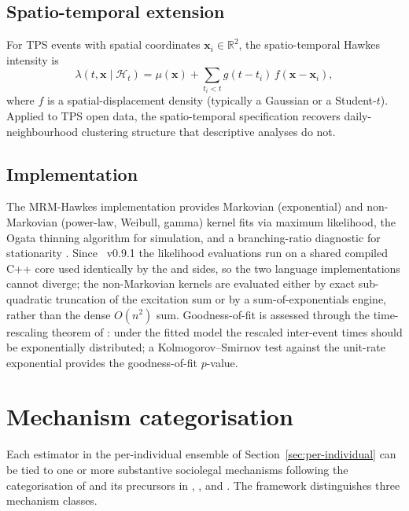 \documentclass[article,shortnames,nojss]{jss}
\begin{document}
\subsection{Spatio-temporal extension}

For TPS events with spatial coordinates $\mathbf{x}_i \in
\mathbb{R}^2$, the spatio-temporal Hawkes intensity is
\begin{equation}
\lambda(t, \mathbf{x} \mid \mathcal{H}_t) = \mu(\mathbf{x}) +
\sum_{t_i < t} g(t - t_i)\, f(\mathbf{x} - \mathbf{x}_i),
\end{equation}
where $f$ is a spatial-displacement density (typically a Gaussian
or a Student-$t$). Applied to TPS open data, the spatio-temporal
specification recovers daily-neighbourhood clustering structure
that descriptive analyses do not.

\subsection{Implementation}

The MRM-Hawkes implementation provides Markovian (exponential) and
non-Markovian (power-law, Weibull, gamma) kernel fits via maximum
likelihood, the Ogata thinning algorithm for simulation, and a
branching-ratio diagnostic for stationarity \citep{Ruhela2026Hawkes}.
Since ~v0.9.1 the likelihood evaluations run on a shared
compiled C++ core used identically by the  and
 sides, so the two language implementations cannot
diverge; the non-Markovian kernels are evaluated either by exact
sub-quadratic truncation of the excitation sum or by a
sum-of-exponentials engine, rather than the dense $O(n^2)$ sum.
Goodness-of-fit is assessed through the time-rescaling theorem of
\citet{BrownEtAl2002}: under the fitted model the rescaled
inter-event times should be exponentially distributed; a
Kolmogorov--Smirnov test against the unit-rate exponential
provides the goodness-of-fit $p$-value.

\section{Mechanism categorisation}
\label{sec:mechanism}

Each estimator in the per-individual ensemble of
Section~\ref{sec:per-individual} can be tied to one or more
substantive sociolegal mechanisms following the categorisation of
\citet{ZorroMedina2023JMP} and its precursors in
\citet{Becker1968}, \citet{CohenFelson1979}, and
\citet{Apel2013}. The framework distinguishes three mechanism
classes.
\end{document}
